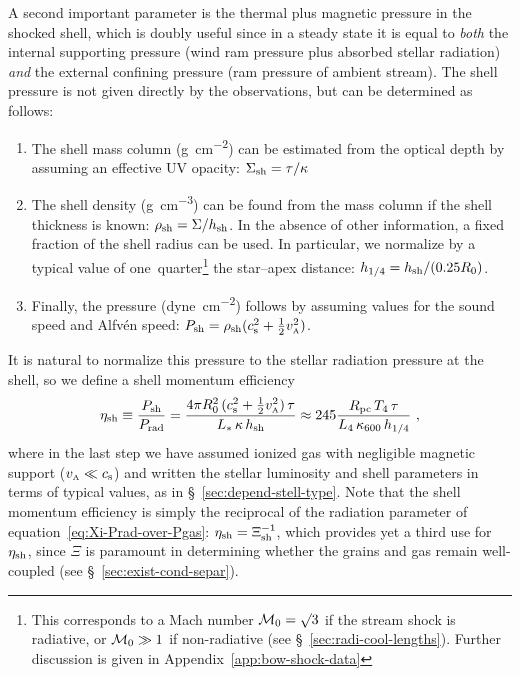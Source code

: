 A second important parameter is the thermal plus magnetic pressure in
the shocked shell, which is doubly useful since in a steady state it
is equal to \emph{both} the internal supporting pressure (wind ram
pressure plus absorbed stellar radiation) \emph{and} the external
confining pressure (ram pressure of ambient stream).  The shell pressure is
not given directly by the observations, but can be determined as
follows:
\begin{enumerate}[1.]
\item The shell mass column (\si{g.cm^{-2}}) can be estimated from the
  optical depth by assuming an effective UV opacity: \(\Sigma_{\text{sh}} = \tau / \kappa\)
\item The shell density (\si{g.cm^{-3}}) can be found from the mass
  column if the shell thickness is known:
  \(\rho_{\text{sh}} = \Sigma / h_{\text{sh}}\).  In the absence of other information, a
  fixed fraction of the shell radius can be used.  In particular, we
  normalize by a typical value of one~quarter\footnote{%
    This corresponds to a Mach number \(\mathcal{M}_0 = \surd 3\) if the stream
    shock is radiative, or \(\mathcal{M}_0 \gg 1\) if non-radiative (see
    \S~\ref{sec:radi-cool-lengths}).  Further discussion is given in
    Appendix~\ref{app:bow-shock-data}} %
  the star--apex distance:
  \(h_{1/4} = h_{\text{sh}} / (0.25 R_0)\).
\item Finally, the pressure (\si{dyne.cm^{-2}}) follows by assuming
  values for the sound speed and Alfvén speed:
  \(P_{\text{sh}} = \rho_{\text{sh}} (c_{\text{s}}^2 + \frac12 v_{\scriptscriptstyle\text{A}}^2) \).
\end{enumerate}
It is natural to normalize this pressure to the stellar radiation
pressure at the shell, so we define a shell momentum efficiency
\newcommand\pc{\ensuremath{_{\text{pc}}}}
\begin{equation}
  \label{eq:eta-shell}
  \eta\shell \equiv \frac{P\shell}{P\rad}
  = \frac{4\pi R_0^2\, (\sound^2 + \frac12 v\alfven^2)\, \tau}{L_*\, \kappa\, h\shell}
  \approx 245 \frac{R\pc \, T_4 \, \tau}{L_4 \, \kappa_{600} \, h_{1/4}} \ , 
\end{equation}
where in the last step we have assumed ionized gas with negligible
magnetic support (\(v_{\scriptscriptstyle\text{A}} \ll c_{\text{s}}\)) and written the stellar
luminosity and shell parameters in terms of typical values, as in
\S~\ref{sec:depend-stell-type}.  Note that the shell momentum
efficiency is simply the reciprocal of the radiation parameter of
equation~\eqref{eq:Xi-Prad-over-Pgas}:
\(\eta_{\text{sh}} = \Xi_{\text{sh}}^{-1}\), which provides yet a third use for
\(\eta_{\text{sh}}\), since \(\Xi\) is paramount in determining whether the
grains and gas remain well-coupled (see
\S~\ref{sec:exist-cond-separ}).

